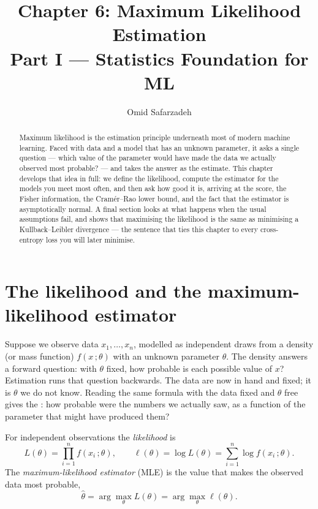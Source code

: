 \documentclass[11pt]{article}
\title{Chapter 6: Maximum Likelihood Estimation \\ \large Part I --- Statistics Foundation for ML}
\author{Omid Safarzadeh}
\date{}
\begin{document}
\maketitle

\begin{abstract}
\noindent
Maximum likelihood is the estimation principle underneath most of modern
machine learning. Faced with data and a model that has an unknown
parameter, it asks a single question --- which value of the parameter would
have made the data we actually observed most probable? --- and takes the
answer as the estimate. This chapter develops that idea in full: we define
the likelihood, compute the estimator for the models you meet most often,
and then ask how good it is, arriving at the score, the Fisher information,
the Cram\'er--Rao lower bound, and the fact that the estimator is
asymptotically normal. A final section looks at what happens when the usual
assumptions fail, and shows that maximising the likelihood is the same as
minimising a Kullback--Leibler divergence --- the sentence that ties this
chapter to every cross-entropy loss you will later minimise.
\end{abstract}

\tableofcontents

\section{The likelihood and the maximum-likelihood estimator}

Suppose we observe data $x_1,\dots,x_n$, modelled as independent draws from
a density (or mass function) $f(x\,;\theta)$ with an unknown parameter
$\theta$. The density answers a forward question: with $\theta$ fixed, how
probable is each possible value of $x$? Estimation runs that question
backwards. The data are now in hand and fixed; it is $\theta$ we do not
know. Reading the same formula with the data fixed and $\theta$ free gives
the : how probable were the numbers we actually saw, as
a function of the parameter that might have produced them?

\begin{definition}
For independent observations the \emph{likelihood} is
\[
  L(\theta) = \prod_{i=1}^{n} f(x_i\,;\theta),
  \qquad
  \ell(\theta) = \log L(\theta) = \sum_{i=1}^{n} \log f(x_i\,;\theta).
\]
The \emph{maximum-likelihood estimator} (MLE) is the value that makes the
observed data most probable,
\[
  \hat\theta = \arg\max_{\theta} L(\theta) = \arg\max_{\theta} \ell(\theta).
\]
\end{definition}
\end{document}

